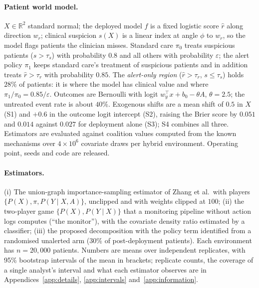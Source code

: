 \documentclass[letterpaper]{article} %
\newcommand{\rhat}{\hat r}
\begin{document}
\paragraph{Patient world model.} $X \in \mathbb{R}^2$ standard normal; the
deployed model $f$ is a fixed logistic score $\rhat$ along direction $w_r$;
clinical suspicion $s(X)$ is a linear index at angle $\phi$ to $w_r$, so the
model flags patients the clinician misses. Standard care $\pi_0$ treats
suspicious patients ($s > \tau_s$) with probability $0.8$ and all others with
probability $\varepsilon$; the alert policy $\pi_1$ keeps standard care's
treatment of suspicious patients and in addition treats $\rhat > \tau_r$
with probability $0.85$. The \emph{alert-only region} ($\rhat > \tau_r$,
$s \le \tau_s$) holds $28\%$ of patients: it is where the model has clinical
value and where $\pi_1 / \pi_0 = 0.85 / \varepsilon$. Outcomes are Bernoulli
with logit $w_y^\top x + b_0 - \theta A$, $\theta = 2.5$; the untreated event
rate is about $40\%$. Exogenous shifts are a mean shift of $0.5$ in $X$ (S1)
and $+0.6$ in the outcome logit intercept (S2), raising the Brier score by
$0.051$ and $0.014$ against $0.027$ for deployment alone (S3); S4 combines all
three. Estimators are evaluated against coalition values computed from the
known mechanisms over $4 \times 10^6$ covariate draws per hybrid environment.
Operating point, seeds and code are released.

\paragraph{Estimators.} (i) The union-graph importance-sampling estimator of
Zhang et al.\ with players $\{P(X), \pi, P(Y \mid X, A)\}$, unclipped and with
weights clipped at $100$; (ii) the two-player game $\{P(X), P(Y \mid X)\}$
that a monitoring pipeline without action logs computes (``the monitor''),
with the covariate density ratio estimated by a classifier; (iii) the proposed
decomposition with the policy term identified from a randomised unalerted arm
($30\%$ of post-deployment patients). Each environment has $n = 20{,}000$
patients. Numbers are means over independent replicates, with 95\% bootstrap
intervals of the mean in brackets; replicate counts, the coverage of a single
analyst's interval and what each estimator observes are in
Appendices~\ref{app:details}, \ref{app:intervals} and~\ref{app:information}.
\end{document}
